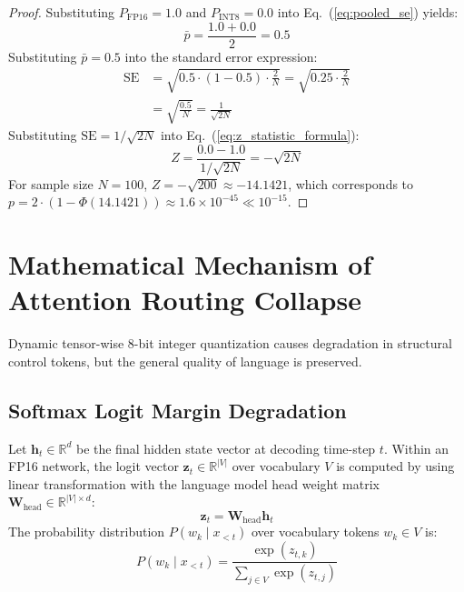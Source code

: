 \documentclass[10pt,journal,compsoc]{IEEEtran}
\begin{document}
\begin{proof}
Substituting $P_{\text{FP16}} = 1.0$ and $P_{\text{INT8}} = 0.0$ into Eq.~(\ref{eq:pooled_se}) yields:
\begin{equation}
    \bar{p} = \frac{1.0 + 0.0}{2} = 0.5
\end{equation}
Substituting $\bar{p} = 0.5$ into the standard error expression:
\begin{equation}
\begin{split}
    \text{SE} &= \sqrt{ 0.5 \cdot (1 - 0.5) \cdot \frac{2}{N} } = \sqrt{ 0.25 \cdot \frac{2}{N} } \\
              &= \sqrt{ \frac{0.5}{N} } = \frac{1}{\sqrt{2N}}
\end{split}
\end{equation}
Substituting $\text{SE} = 1/\sqrt{2N}$ into Eq.~(\ref{eq:z_statistic_formula}):
\begin{equation}
    Z = \frac{0.0 - 1.0}{1 / \sqrt{2N}} = -\sqrt{2N}
\end{equation}
For sample size $N=100$, $Z = -\sqrt{200} \approx -14.1421$, which corresponds to $p = 2 \cdot (1 - \Phi(14.1421)) \approx 1.6 \times 10^{-45} \ll 10^{-15}$.
\end{proof}


\section{Mathematical Mechanism of Attention Routing Collapse}

Dynamic tensor-wise 8-bit integer quantization causes degradation in structural control tokens, but the general quality of language is preserved.

\subsection{Softmax Logit Margin Degradation}

Let $\mathbf{h}_t \in \mathbb{R}^d$ be the final hidden state vector at decoding time-step $t$. Within an FP16 network, the logit vector $\mathbf{z}_t \in \mathbb{R}^{|V|}$ over vocabulary $V$ is computed by using linear transformation with the language model head weight matrix $\mathbf{W}_{\text{head}} \in \mathbb{R}^{|V| \times d}$:
\begin{equation}
    \mathbf{z}_t = \mathbf{W}_{\text{head}} \mathbf{h}_t
\end{equation}
The probability distribution $P(w_k \mid x_{<t})$ over vocabulary tokens $w_k \in V$ is:
\begin{equation}
    P(w_k \mid x_{<t}) = \frac{\exp(z_{t,k})}{\sum_{j \in V} \exp(z_{t,j})}
\end{equation}
\end{document}

